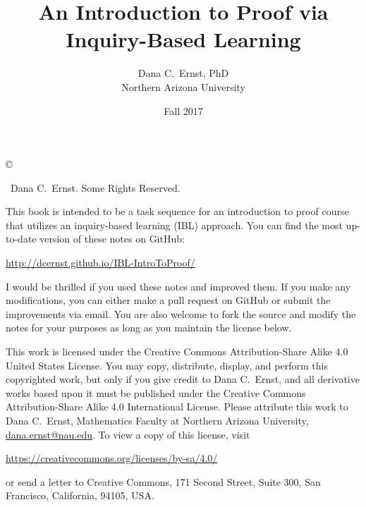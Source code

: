 \documentclass[12pt,oneside]{book}
\theoremstyle{definition}
\begin{document}
\title{An Introduction to Proof via \\Inquiry-Based Learning}
\author{Dana C.~Ernst, PhD\\
Northern Arizona University}
\date{Fall 2017}

\maketitle
\thispagestyle{empty}

\noindent\copyright{ \the\year\ Dana C.~Ernst.  Some Rights Reserved.\\

\bigskip

\noindent This book is intended to be a task sequence for an introduction to proof course that utilizes an inquiry-based learning (IBL) approach.  You can find the most up-to-date version of these notes on GitHub:
\begin{center}
\url{http://dcernst.github.io/IBL-IntroToProof/}
\end{center}
I would be thrilled if you used these notes and improved them. If you make any modifications, you can either make a pull request on GitHub or submit the improvements via email.  You are also welcome to fork the source and modify the notes for your purposes as long as you maintain the license below.

\bigskip

\noindent This work is licensed under the Creative Commons Attribution-Share Alike 4.0 United States License.  You may copy, distribute, display, and perform this copyrighted work, but only if you give credit to Dana C.~Ernst, and all derivative works based upon it must be published under the Creative Commons Attribution-Share Alike 4.0 International License. Please attribute this work to Dana C.~Ernst, Mathematics Faculty at Northern Arizona University, \url{dana.ernst@nau.edu}. To view a copy of this license, visit
\begin{center}
\url{https://creativecommons.org/licenses/by-sa/4.0/}
\end{center}
or send a letter to Creative Commons, 171 Second Street, Suite 300, San Francisco, California, 94105, USA.}

\medskip

\begin{center}
\ccbysa
\end{center}

\bigskip
\end{document}
